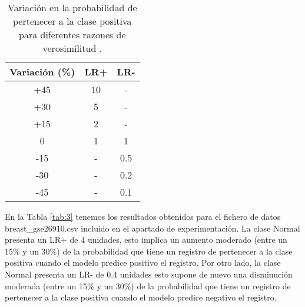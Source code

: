 \bigbreak

\begin{table}[ht]
    \centering
    \begin{tabularx}{195pt}{c c c}
        Variación (\%) & \hspace{20pt}LR+\hspace{20pt} & LR- \\\hline
        +45                              & 10                            & -   \\\hline
        +30                              & 5                             & -   \\\hline
        +15                              & 2                             & -   \\\hline
        0                                & 1                             & 1   \\\hline
        -15                              & -                             & 0.5 \\\hline
        -30                              & -                             & 0.2 \\\hline
        -45                              & -                             & 0.1 \\\hline
    \end{tabularx}

    \caption{Variación en la probabilidad de pertenecer a la clase positiva para diferentes razones de verosimilitud \cite{McGee2002}.}
    \label{tab:2}
\end{table}

\bigbreak

En la Tabla \ref{tab:3} tenemos los resultados obtenidos para el fichero de datos breast\_gse26910.csv incluido en el apartado de experimentación. La clase Normal presenta un LR+ de 4 unidades, esto implica un aumento moderado (entre un 15\% y un 30\%) de la probabilidad que tiene un registro de pertenecer a la clase positiva cuando el modelo predice positivo el registro. Por otro lado, la clase Normal presenta un LR- de 0.4 unidades esto supone de nuevo una disminución moderada (entre un 15\% y un 30\%) de la probabilidad que tiene un registro de pertenecer a la clase positiva cuando el modelo predice negativo el registro.

\bigbreak


